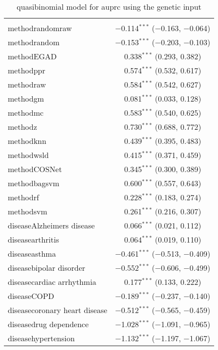 
\begin{table}[!htbp] \centering 
  \caption{quasibinomial model for auprc using the genetic input} 
  \label{} 
\begin{tabular}{@{\extracolsep{5pt}}lc} 
\\[-1.8ex]\hline 
\hline \\[-1.8ex] 
 methodrandomraw & $-$0.114$^{***}$ ($-$0.163, $-$0.064) \\ 
  methodrandom & $-$0.153$^{***}$ ($-$0.203, $-$0.103) \\ 
  methodEGAD & 0.338$^{***}$ (0.293, 0.382) \\ 
  methodppr & 0.574$^{***}$ (0.532, 0.617) \\ 
  methodraw & 0.584$^{***}$ (0.542, 0.627) \\ 
  methodgm & 0.081$^{***}$ (0.033, 0.128) \\ 
  methodmc & 0.583$^{***}$ (0.540, 0.625) \\ 
  methodz & 0.730$^{***}$ (0.688, 0.772) \\ 
  methodknn & 0.439$^{***}$ (0.395, 0.483) \\ 
  methodwsld & 0.415$^{***}$ (0.371, 0.459) \\ 
  methodCOSNet & 0.345$^{***}$ (0.300, 0.389) \\ 
  methodbagsvm & 0.600$^{***}$ (0.557, 0.643) \\ 
  methodrf & 0.228$^{***}$ (0.183, 0.274) \\ 
  methodsvm & 0.261$^{***}$ (0.216, 0.307) \\ 
  diseaseAlzheimers disease & 0.066$^{***}$ (0.021, 0.112) \\ 
  diseasearthritis & 0.064$^{***}$ (0.019, 0.110) \\ 
  diseaseasthma & $-$0.461$^{***}$ ($-$0.513, $-$0.409) \\ 
  diseasebipolar disorder & $-$0.552$^{***}$ ($-$0.606, $-$0.499) \\ 
  diseasecardiac arrhythmia & 0.177$^{***}$ (0.133, 0.222) \\ 
  diseaseCOPD & $-$0.189$^{***}$ ($-$0.237, $-$0.140) \\ 
  diseasecoronary heart disease & $-$0.512$^{***}$ ($-$0.565, $-$0.459) \\ 
  diseasedrug dependence & $-$1.028$^{***}$ ($-$1.091, $-$0.965) \\ 
  diseasehypertension & $-$1.132$^{***}$ ($-$1.197, $-$1.067) \\ 

\end{tabular}
\end{table}
